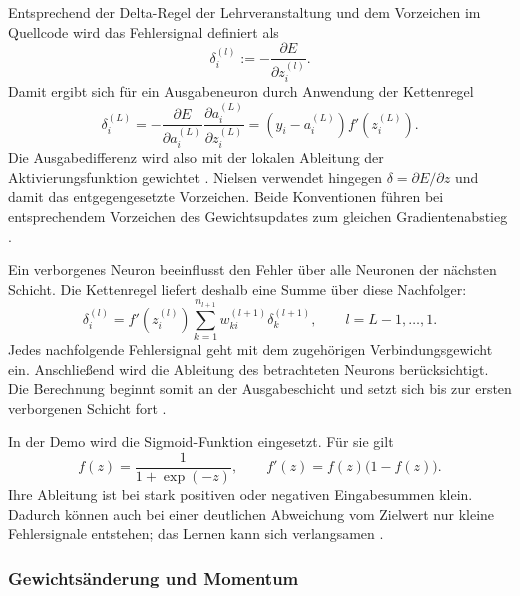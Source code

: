 Entsprechend der Delta-Regel der Lehrveranstaltung und dem Vorzeichen im
Quellcode wird das Fehlersignal definiert als
\begin{equation}
	\delta_i^{(l)} := -\frac{\partial E}{\partial z_i^{(l)}}.
	\label{eq:bp-delta-definition}
\end{equation}
Damit ergibt sich für ein Ausgabeneuron durch Anwendung der Kettenregel
\begin{equation}
	\delta_i^{(L)}
	= -\frac{\partial E}{\partial a_i^{(L)}}
	\frac{\partial a_i^{(L)}}{\partial z_i^{(L)}}
	= \left(y_i-a_i^{(L)}\right) f'\!\left(z_i^{(L)}\right).
	\label{eq:bp-output-delta}
\end{equation}
Die Ausgabedifferenz wird also mit der lokalen Ableitung der
Aktivierungsfunktion gewichtet \parencite[Folie~10]{vieten_sw03}.
Nielsen verwendet hingegen $\delta=\partial E/\partial z$ und damit das
entgegengesetzte Vorzeichen. Beide Konventionen führen bei entsprechendem
Vorzeichen des Gewichtsupdates zum gleichen Gradientenabstieg
\parencite[Kap.~2]{nielsen2015}.

Ein verborgenes Neuron beeinflusst den Fehler über alle Neuronen der nächsten
Schicht. Die Kettenregel liefert deshalb eine Summe über diese Nachfolger:
\begin{equation}
	\delta_i^{(l)}
	= f'\!\left(z_i^{(l)}\right)
	\sum_{k=1}^{n_{l+1}} w_{ki}^{(l+1)}\delta_k^{(l+1)},
	\qquad l=L-1,\ldots,1.
	\label{eq:bp-hidden-delta}
\end{equation}
Jedes nachfolgende Fehlersignal geht mit dem zugehörigen Verbindungsgewicht
ein. Anschließend wird die Ableitung des betrachteten Neurons berücksichtigt.
Die Berechnung beginnt somit an der Ausgabeschicht und setzt sich bis zur
ersten verborgenen Schicht fort
\parencite[Folien~10 und~12]{vieten_sw03}.

In der Demo wird die Sigmoid-Funktion eingesetzt. Für sie gilt
\begin{equation}
	f(z)=\frac{1}{1+\exp(-z)},
	\qquad f'(z)=f(z)\bigl(1-f(z)\bigr).
	\label{eq:bp-sigmoid}
\end{equation}
Ihre Ableitung ist bei stark positiven oder negativen Eingabesummen klein.
Dadurch können auch bei einer deutlichen Abweichung vom Zielwert nur kleine
Fehlersignale entstehen; das Lernen kann sich verlangsamen
\parencite[Kap.~2]{nielsen2015}.

\subsubsection{Gewichtsänderung und Momentum}


